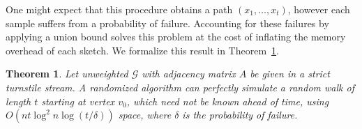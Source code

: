 \documentclass{report}
\newtheorem{theorem}{Theorem}[section]
\begin{document}
One might expect that this procedure obtains a path $(x_1, \dots, x_t)$, however each sample suffers from a probability of failure. 
Accounting for these failures by applying a union bound solves this problem at the cost of inflating the memory overhead of each sketch.
We formalize this result in Theorem~\ref{thm:rw:sampling:turnstile}.
%
\begin{theorem} \label{thm:rw:sampling:turnstile}
Let unweighted $\mathcal{G}$ with adjacency matrix $A$ be given in a strict turnstile stream.
A randomized algorithm can perfectly simulate a random walk of length $t$  starting at vertex $v_0$, which need not be known ahead of time, using $O(nt\log^2 n \log (t/\delta))$ space, where $\delta$ is the probability of failure.
\end{theorem}
\end{document}
